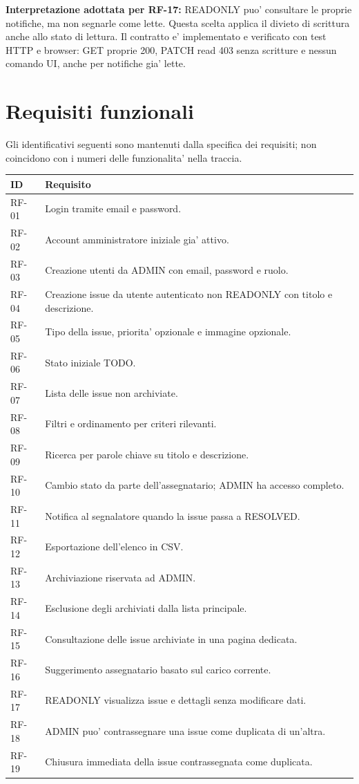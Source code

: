 \documentclass[11pt,a4paper,oneside]{report}
\begin{document}
\textbf{Interpretazione adottata per RF-17:} READONLY puo'
consultare le proprie notifiche, ma non segnarle come lette. Questa scelta
applica il divieto di scrittura anche allo stato di lettura. Il contratto e' implementato e
verificato con test HTTP e browser: GET proprie 200, PATCH read 403 senza
scritture e nessun comando UI, anche per notifiche gia' lette.

\section{Requisiti funzionali}
Gli identificativi seguenti sono mantenuti dalla specifica dei requisiti;
non coincidono con i numeri delle funzionalita' nella traccia.
\begin{longtable}{P{0.12\textwidth} P{0.81\textwidth}}
\toprule ID & Requisito\\\midrule\endhead
RF-01 & Login tramite email e password.\\
RF-02 & Account amministratore iniziale gia' attivo.\\
RF-03 & Creazione utenti da ADMIN con email, password e ruolo.\\
RF-04 & Creazione issue da utente autenticato non READONLY con titolo e descrizione.\\
RF-05 & Tipo della issue, priorita' opzionale e immagine opzionale.\\
RF-06 & Stato iniziale TODO.\\
RF-07 & Lista delle issue non archiviate.\\
RF-08 & Filtri e ordinamento per criteri rilevanti.\\
RF-09 & Ricerca per parole chiave su titolo e descrizione.\\
RF-10 & Cambio stato da parte dell'assegnatario; ADMIN ha accesso completo.\\
RF-11 & Notifica al segnalatore quando la issue passa a RESOLVED.\\
RF-12 & Esportazione dell'elenco in CSV.\\
RF-13 & Archiviazione riservata ad ADMIN.\\
RF-14 & Esclusione degli archiviati dalla lista principale.\\
RF-15 & Consultazione delle issue archiviate in una pagina dedicata.\\
RF-16 & Suggerimento assegnatario basato sul carico corrente.\\
RF-17 & READONLY visualizza issue e dettagli senza modificare dati.\\
RF-18 & ADMIN puo' contrassegnare una issue come duplicata di un'altra.\\
RF-19 & Chiusura immediata della issue contrassegnata come duplicata.\\
\bottomrule
\end{longtable}
\end{document}
